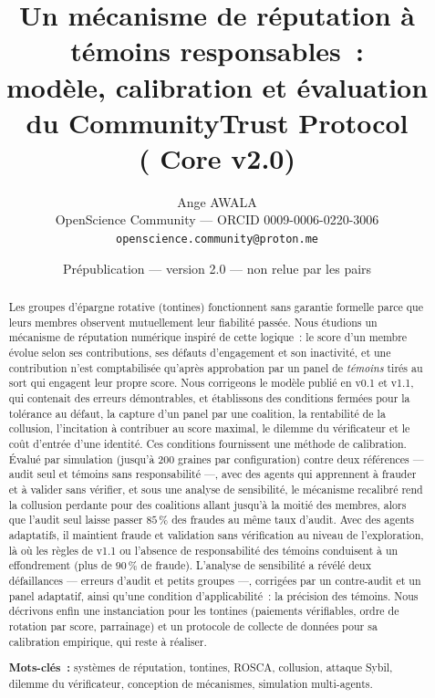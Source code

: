\documentclass[11pt,a4paper]{article}
\title{\textbf{Un mécanisme de réputation à témoins responsables~:\\
modèle, calibration et évaluation du CommunityTrust Protocol\\(\CTP{} Core v2.0)}}
\author{Ange AWALA\\
\small OpenScience Community --- ORCID 0009-0006-0220-3006\\
\small \texttt{openscience.community@proton.me}}
\date{\small Prépublication --- version 2.0 --- non relue par les pairs}
\theoremstyle{plain}
\theoremstyle{definition}
\theoremstyle{remark}
\newcommand{\1}{\mathbf{1}}
\begin{document}
\maketitle

\begin{abstract}
\noindent
Les groupes d'épargne rotative (tontines) fonctionnent sans garantie formelle
parce que leurs membres observent mutuellement leur fiabilité passée. Nous
étudions un mécanisme de réputation numérique inspiré de cette logique~: le
score d'un membre évolue selon ses contributions, ses défauts d'engagement et
son inactivité, et une contribution n'est comptabilisée qu'après approbation
par un panel de \emph{témoins} tirés au sort qui engagent leur propre score.
Nous corrigeons le modèle publié en v0.1 et v1.1, qui contenait des erreurs
démontrables, et établissons des conditions fermées pour la tolérance au
défaut, la capture d'un panel par une coalition, la rentabilité de la
collusion, l'incitation à contribuer au score maximal, le dilemme du
vérificateur et le coût d'entrée d'une identité. Ces conditions fournissent une
méthode de calibration. Évalué par simulation (jusqu'à 200 graines par
configuration) contre deux références --- audit seul et témoins sans
responsabilité ---, avec des agents qui apprennent à frauder et à valider sans
vérifier, et sous une analyse de sensibilité, le mécanisme recalibré
rend la collusion perdante pour des coalitions allant jusqu'à la moitié des
membres, alors que l'audit seul laisse passer $85\,\%$ des fraudes au même
taux d'audit. Avec des agents adaptatifs, il maintient fraude et validation
sans vérification au niveau de l'exploration, là où les règles de v1.1 ou
l'absence de responsabilité des témoins conduisent à un effondrement (plus de
$90\,\%$ de fraude). L'analyse de sensibilité a révélé deux défaillances ---
erreurs d'audit et petits groupes ---, corrigées par un contre-audit et un panel
adaptatif, ainsi qu'une condition d'applicabilité~: la précision des témoins.
Nous décrivons enfin une instanciation pour les tontines (paiements
vérifiables, ordre de rotation par score, parrainage) et un protocole de
collecte de données pour sa calibration empirique, qui reste à réaliser.

\medskip\noindent
\textbf{Mots-clés~:} systèmes de réputation, tontines, ROSCA, collusion,
attaque Sybil, dilemme du vérificateur, conception de mécanismes,
simulation multi-agents.
\end{abstract}

\end{document}
